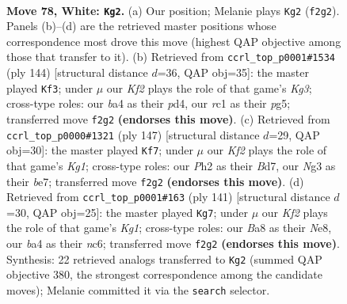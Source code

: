 \documentclass[11pt]{article}
\begin{document}
\clearpage

\begin{figure}[p]\centering
\begin{subfigure}{0.46\textwidth}\centering
\resizebox{\linewidth}{!}{%
\newchessgame
\chessboard[
  setfen={B7/5p2/n5p1/4P2p/b4Pp1/3k2N1/5K1P/2r5 w - - 14 78},
  showmover=false,
  pgfstyle=straightmove, color=movearrow, markmove={f2-g2}
]}
\caption{}
\end{subfigure}\hfill
\begin{subfigure}{0.46\textwidth}\centering
\resizebox{\linewidth}{!}{%
\newchessgame
\chessboard[
  setfen={8/1p3pk1/p7/P1N3pP/1P1p4/6K1/8/8 w - - 2 73},
  showmover=false,
  pgfstyle=straightmove, color=movearrow, markmove={g3-f3}
]}
\caption{}
\end{subfigure}
\\[4pt]
\begin{subfigure}{0.46\textwidth}\centering
\resizebox{\linewidth}{!}{%
\newchessgame
\chessboard[
  setfen={6k1/3bB2p/4n2P/4P1p1/2pP4/2P5/6B1/K7 b - - 0 74},
  showmover=false,
  pgfstyle=straightmove, color=movearrow, markmove={g8-f7}
]}
\caption{}
\end{subfigure}\hfill
\begin{subfigure}{0.46\textwidth}\centering
\resizebox{\linewidth}{!}{%
\newchessgame
\chessboard[
  setfen={4n1k1/8/2N3p1/5p1p/1B2nP1P/6P1/6K1/8 b - - 1 71},
  showmover=false,
  pgfstyle=straightmove, color=movearrow, markmove={g8-g7}
]}
\caption{}
\end{subfigure}
\caption{\textbf{Move 78, White: \texttt{Kg2}.} (a) Our position; Melanie plays \texttt{Kg2} (\texttt{f2g2}). Panels (b)--(d) are the retrieved master positions whose correspondence most drove this move (highest QAP objective among those that transfer to it). (b) Retrieved from \texttt{ccrl\_top\_p0001\#1534} (ply 144) [structural distance $d$=36, QAP obj=35]: the master played \texttt{Kf3}; under $\mu$ our \emph{Kf2} plays the role of that game's \emph{Kg3}; cross-type roles: our \emph{b}a4 as their \emph{p}d4, our \emph{r}c1 as their \emph{p}g5; transferred move \texttt{f2g2} \textbf{(endorses this move)}. (c) Retrieved from \texttt{ccrl\_top\_p0000\#1321} (ply 147) [structural distance $d$=29, QAP obj=30]: the master played \texttt{Kf7}; under $\mu$ our \emph{Kf2} plays the role of that game's \emph{Kg1}; cross-type roles: our \emph{P}h2 as their \emph{B}d7, our \emph{N}g3 as their \emph{b}e7; transferred move \texttt{f2g2} \textbf{(endorses this move)}. (d) Retrieved from \texttt{ccrl\_top\_p0001\#163} (ply 141) [structural distance $d$=30, QAP obj=25]: the master played \texttt{Kg7}; under $\mu$ our \emph{Kf2} plays the role of that game's \emph{Kg1}; cross-type roles: our \emph{B}a8 as their \emph{N}e8, our \emph{b}a4 as their \emph{n}c6; transferred move \texttt{f2g2} \textbf{(endorses this move)}. Synthesis: 22 retrieved analogs transferred to \texttt{Kg2} (summed QAP objective 380, the strongest correspondence among the candidate moves); Melanie committed it via the \texttt{search} selector.}
\label{fig:thought-m154}
\end{figure}
\end{document}
